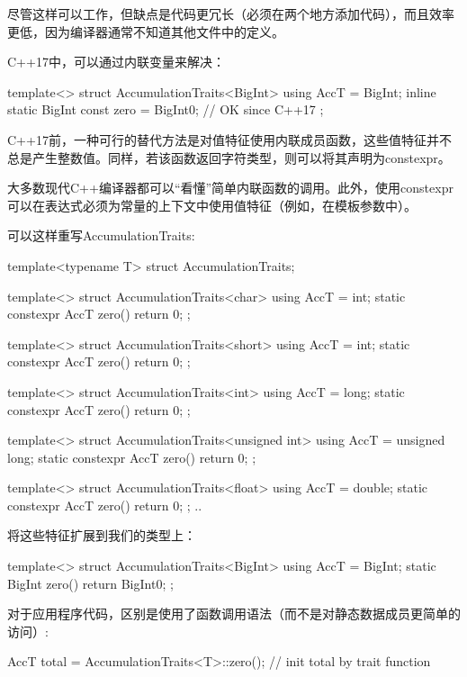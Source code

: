 尽管这样可以工作，但缺点是代码更冗长（必须在两个地方添加代码），而且效率更低，因为编译器通常不知道其他文件中的定义。

C++17中，可以通过内联变量来解决：

\begin{cpp}
template<>
struct AccumulationTraits<BigInt> {
	using AccT = BigInt;
	inline static BigInt const zero = BigInt{0}; // OK since C++17
};
\end{cpp}

C++17前，一种可行的替代方法是对值特征使用内联成员函数，这些值特征并不总是产生整数值。同样，若该函数返回字符类型，则可以将其声明为constexpr。

\begin{notice}
大多数现代C++编译器都可以“看懂”简单内联函数的调用。此外，使用constexpr可以在表达式必须为常量的上下文中使用值特征（例如，在模板参数中）。
\end{notice}

可以这样重写AccumulationTraits:

\begin{cpp}
template<typename T>
struct AccumulationTraits;

template<>
struct AccumulationTraits<char> {
	using AccT = int;
	static constexpr AccT zero() {
		return 0;
	}
};

template<>
struct AccumulationTraits<short> {
	using AccT = int;
	static constexpr AccT zero() {
		return 0;
	}
};

template<>
struct AccumulationTraits<int> {
	using AccT = long;
	static constexpr AccT zero() {
		return 0;
	}
};

template<>
struct AccumulationTraits<unsigned int> {
	using AccT = unsigned long;
	static constexpr AccT zero() {
		return 0;
	}
};

template<>
struct AccumulationTraits<float> {
	using AccT = double;
	static constexpr AccT zero() {
		return 0;
	}
};
..
\end{cpp}

将这些特征扩展到我们的类型上：

\begin{cpp}
template<>
struct AccumulationTraits<BigInt> {
	using AccT = BigInt;
	static BigInt zero() {
		return BigInt{0};
	}
};
\end{cpp}

对于应用程序代码，区别是使用了函数调用语法（而不是对静态数据成员更简单的访问）:

\begin{cpp}
AccT total = AccumulationTraits<T>::zero(); // init total by trait function
\end{cpp}

